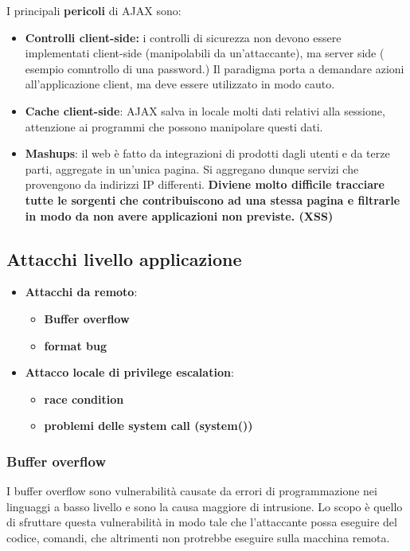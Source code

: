 \documentclass[12pt]{article}
\begin{document}
				I principali \textbf{pericoli} di AJAX sono:
				\begin{itemize}
					\item \textbf{Controlli client-side:} i controlli di sicurezza non devono essere implementati client-side (manipolabili da un'attaccante), ma server side ( esempio comntrollo di una password.) Il paradigma porta a demandare azioni all'applicazione client, ma deve essere utilizzato in modo cauto.
					\item \textbf{Cache client-side}: AJAX salva in locale molti dati relativi alla sessione, attenzione ai programmi che possono manipolare questi dati.
					\item \textbf{Mashups}: il web è fatto da integrazioni di prodotti dagli utenti e da terze parti, aggregate in un'unica pagina. Si aggregano dunque servizi che provengono da indirizzi IP differenti. \textbf{Diviene molto difficile tracciare tutte le sorgenti che contribuiscono ad una stessa pagina e filtrarle in modo da non avere applicazioni non previste. (XSS)}  
				\end{itemize}
		\subsection{Attacchi livello applicazione}
			\begin{itemize}
				\item \textbf{Attacchi da remoto}:
				\begin{itemize}
					\item \textbf{Buffer overflow}
					\item \textbf{format bug}				
				\end{itemize}
				\item \textbf{Attacco locale di privilege escalation}:
				\begin{itemize}
					\item \textbf{race condition}
					\item \textbf{problemi delle system call (system())}
				\end{itemize}
			\end{itemize}
			\subsubsection{Buffer overflow}
				I buffer overflow sono vulnerabilità causate da errori di programmazione nei linguaggi a basso livello e sono la causa maggiore di intrusione. Lo scopo è quello di sfruttare questa vulnerabilità in modo tale che l'attaccante possa eseguire del codice, comandi, che altrimenti non protrebbe eseguire sulla macchina remota.\\
				
\end{document}
